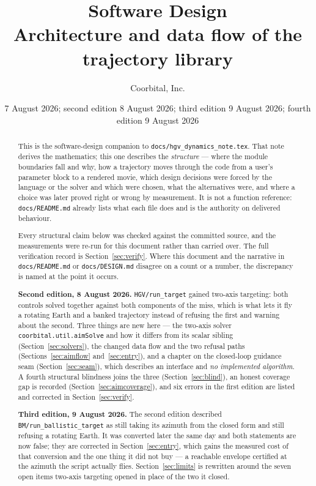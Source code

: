 \documentclass[11pt]{article}
\title{Software Design\\
       \large Architecture and data flow of the \code{missiles/} trajectory library}
\author{Coorbital, Inc.}
\date{7 August 2026; second edition 8 August 2026; third edition 9 August 2026;
      fourth edition 9 August 2026}
\newcommand{\code}[1]{\texttt{#1}}
\begin{document}
\maketitle

\begin{abstract}
This is the software-design companion to \code{docs/hgv\_dynamics\_note.tex}.
That note derives the mathematics; this one describes the \emph{structure} ---
where the module boundaries fall and why, how a trajectory moves through the
code from a user's parameter block to a rendered movie, which design decisions
were forced by the language or the solver and which were chosen, what the
alternatives were, and where a choice was later proved right or wrong by
measurement. It is not a function reference: \code{docs/README.md} already
lists what each file does and is the authority on delivered behaviour.

Every structural claim below was checked against the committed source, and the
measurements were re-run for this document rather than carried over. The full
verification record is Section~\ref{sec:verify}. Where this document and the
narrative in \code{docs/README.md} or \code{docs/DESIGN.md} disagree on a
count or a number, the discrepancy is named at the point it occurs.

\medskip
\noindent\textbf{Second edition, 8 August 2026.} \code{HGV/run\_target} gained
two-axis targeting: both controls solved together against both components of
the miss, which is what lets it fly a rotating Earth and a banked trajectory
instead of refusing the first and warning about the second. Three things are
new here --- the two-axis solver
\code{coorbital.util.aimSolve} and how it differs from its scalar sibling
(Section~\ref{sec:solvers}), the changed data flow and the two refusal paths
(Sections~\ref{sec:aimflow} and~\ref{sec:entry}), and a chapter on the
closed-loop guidance seam (Section~\ref{sec:seam}), which describes an
interface and \emph{no implemented algorithm}. A fourth structural blindness
joins the three (Section~\ref{sec:blind}), an honest coverage gap is recorded
(Section~\ref{sec:aimcoverage}), and six errors in the first edition are listed
and corrected in Section~\ref{sec:verify}.

\medskip
\noindent\textbf{Third edition, 9 August 2026.} The second edition described
\code{BM/run\_ballistic\_target} as still taking its azimuth from the closed
form and still refusing a rotating Earth. It was converted later the same day
and both statements are now false; they are corrected in
Section~\ref{sec:entry}, which gains the measured cost of that conversion and
the one thing it did not buy --- a reachable envelope certified at the azimuth
the script actually flies. Section~\ref{sec:limits} is rewritten around the
seven open items two-axis targeting opened in place of the two it closed.


\end{abstract}
\end{document}
